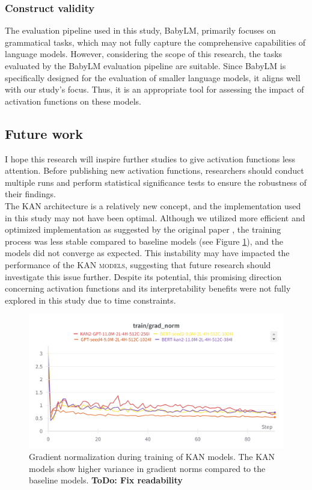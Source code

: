 \subsubsection{Construct validity}
The evaluation pipeline used in this study, BabyLM, primarily focuses on grammatical tasks, which may not fully capture the comprehensive capabilities of language models. However, considering the scope of this research, the tasks evaluated by the BabyLM evaluation pipeline are suitable. Since BabyLM is specifically designed for the evaluation of smaller language models, it aligns well with our study's focus. Thus, it is an appropriate tool for assessing the impact of activation functions on these models.

\subsection{Future work}
I hope this research will inspire further studies to give activation functions less attention. Before publishing new activation functions, researchers should conduct multiple runs and perform statistical significance tests to ensure the robustness of their findings. \\ 
The KAN architecture is a relatively new concept, and the implementation used in this study may not have been optimal. Although we utilized more efficient and optimized implementation as suggested by the original paper \cite{Liu2024}, the training process was less stable compared to baseline models (see Figure \ref{fig:grad-norm}), and the models did not converge as expected. This instability may have impacted the performance of the \textsc{KAN models}, suggesting that future research should investigate this issue further. Despite its potential, this promising direction concerning activation functions and its interpretability benefits were not fully explored in this study due to time constraints.

\begin{figure}[ht]
    \centering
    \includegraphics[width=\columnwidth]{figures/train-grad-norm.png}
    \caption{Gradient normalization during training of KAN models. The KAN models show higher variance in gradient norms compared to the baseline models. \textbf{ToDo: Fix readability}}
    \label{fig:grad-norm}
\end{figure}
